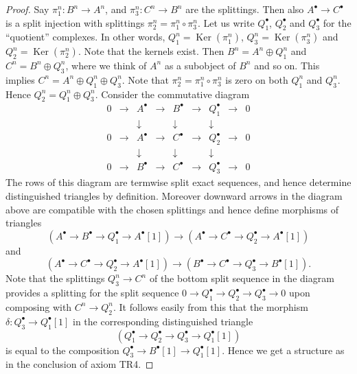 \documentclass{amsart}
\theoremstyle{plain}
\theoremstyle{definition}
\theoremstyle{remark}
\numberwithin{equation}{subsection}
\def\Ker{\mathop{\mathrm{Ker}}}
\begin{document}
\begin{proof}
Say $\pi_1^n : B^n \to A^n$, and $\pi_3^n : C^n \to B^n$ are the splittings.
Then also $A^\bullet \to C^\bullet$ is a split injection with splittings
$\pi_2^n = \pi_1^n \circ \pi_3^n$. Let us write $Q_1^\bullet$, $Q_2^\bullet$
and $Q_3^\bullet$ for the ``quotient'' complexes. In other words,
$Q_1^n = \Ker(\pi_1^n)$, $Q_3^n = \Ker(\pi_3^n)$ and
$Q_2^n = \Ker(\pi_2^n)$. Note that the kernels exist. Then
$B^n = A^n \oplus Q_1^n$ and $C^n = B^n \oplus Q_3^n$, where we think of $A^n$
as a subobject of $B^n$ and so on. This implies
$C^n = A^n \oplus Q_1^n \oplus Q_3^n$. Note that
$\pi_2^n = \pi_1^n \circ \pi_3^n$ is zero on both $Q_1^n$ and $Q_3^n$. Hence
$Q_2^n = Q_1^n \oplus Q_3^n$. Consider the commutative diagram
$$
\begin{matrix}
0 & \to & A^\bullet & \to & B^\bullet & \to & Q_1^\bullet & \to & 0 \\
  &     & \downarrow &     & \downarrow &     & \downarrow  & \\
0 & \to & A^\bullet & \to & C^\bullet & \to & Q_2^\bullet & \to & 0 \\
  &     & \downarrow &     & \downarrow &     & \downarrow  & \\
0 & \to & B^\bullet & \to & C^\bullet & \to & Q_3^\bullet & \to & 0
\end{matrix}
$$
The rows of this diagram are termwise split exact sequences, and
hence determine distinguished triangles by
definition. Moreover downward arrows in the diagram above
are compatible with the chosen splittings and hence
define morphisms of triangles
$$
(A^\bullet \to B^\bullet \to Q_1^\bullet \to A^\bullet[1])
\longrightarrow
(A^\bullet \to C^\bullet \to Q_2^\bullet \to A^\bullet[1])
$$
and
$$
(A^\bullet \to C^\bullet \to Q_2^\bullet \to A^\bullet[1])
\longrightarrow
(B^\bullet \to C^\bullet \to Q_3^\bullet \to B^\bullet[1]).
$$
Note that the splittings $Q_3^n \to C^n$
of the bottom split sequence in the diagram provides a splitting
for the split sequence
$0 \to Q_1^\bullet \to Q_2^\bullet \to Q_3^\bullet \to 0$
upon composing with $C^n \to Q_2^n$. It follows easily from this
that the morphism $\delta : Q_3^\bullet \to Q_1^\bullet[1]$
in the corresponding distinguished triangle
$$
(Q_1^\bullet \to Q_2^\bullet \to Q_3^\bullet \to Q_1^\bullet[1])
$$
is equal to the composition $Q_3^\bullet \to B^\bullet[1] \to Q_1^\bullet[1]$.
Hence we get a structure as in the conclusion of axiom TR4.
\end{proof}
\end{document}
